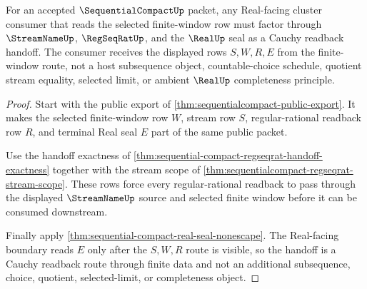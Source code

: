 \begin{theorem}
\label{thm:sequential-compact-real-subsequence-cauchy-handoff}
For an accepted $\SequentialCompactUp$ packet, any Real-facing cluster consumer that reads the selected finite-window row must factor through $\StreamNameUp$, $\RegSeqRatUp$, and the $\RealUp$ seal as a Cauchy readback handoff. The consumer receives the displayed rows $S,W,R,E$ from the finite-window route, not a host subsequence object, countable-choice schedule, quotient stream equality, selected limit, or ambient $\RealUp$ completeness principle.
\end{theorem}
\begin{proof}
Start with the public export of \autoref{thm:sequentialcompact-public-export}. It makes the selected finite-window row $W$, stream row $S$, regular-rational readback row $R$, and terminal Real seal $E$ part of the same public packet.

Use the handoff exactness of \autoref{thm:sequential-compact-regseqrat-handoff-exactness} together with the stream scope of \autoref{thm:sequentialcompact-regseqrat-stream-scope}. These rows force every regular-rational readback to pass through the displayed $\StreamNameUp$ source and selected finite window before it can be consumed downstream.

Finally apply \autoref{thm:sequential-compact-real-seal-nonescape}. The Real-facing boundary reads $E$ only after the $S,W,R$ route is visible, so the handoff is a Cauchy readback route through finite data and not an additional subsequence, choice, quotient, selected-limit, or completeness object.
\end{proof}

